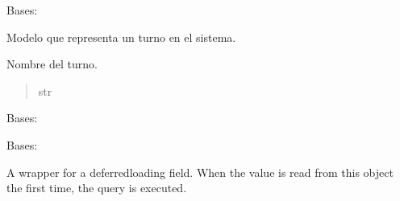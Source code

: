 \documentclass[letterpaper,10pt,spanish]{sphinxmanual}
\begin{document}
\begin{fulllineitems}

\pysigstartsignatures
{}
\pysigstopsignatures
\sphinxAtStartPar
Bases: 

\sphinxAtStartPar
Modelo que representa un turno en el sistema.


\begin{fulllineitems}

\pysigstartsignatures
{}
\pysigstopsignatures
\sphinxAtStartPar
Nombre del turno.
\begin{quote}\begin{description}
\sphinxAtStartPar
str

\end{description}\end{quote}

\end{fulllineitems}



\begin{fulllineitems}

\pysigstartsignatures
{}
\pysigstopsignatures
\sphinxAtStartPar
Bases: 

\end{fulllineitems}



\begin{fulllineitems}

\pysigstartsignatures
{}
\pysigstopsignatures
\sphinxAtStartPar
Bases: 

\end{fulllineitems}



\begin{fulllineitems}

\pysigstartsignatures
{}
\pysigstopsignatures
\sphinxAtStartPar
A wrapper for a deferred\sphinxhyphen{}loading field. When the value is read from this
object the first time, the query is executed.


\end{fulllineitems}
\end{fulllineitems}
\end{document}
